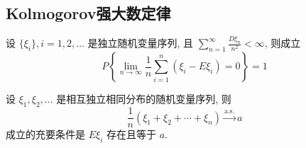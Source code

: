 \subsection{Kolmogorov强大数定律}\label{subsec:Kolmogorov强大数定律}
\begin{theorem} \label{thm:kolmogorov_slln}
设 $\{\xi_i\}, i = 1,2,\ldots$ 是独立随机变量序列, 且 $\sum_{n=1}^\infty \frac{D\xi_n}{n^2} < \infty$, 则成立
\begin{equation} \label{eq:kolmogorov_slln_formula}
P\left\{ \lim_{n\to\infty} \frac{1}{n}\sum_{i=1}^n (\xi_i - E\xi_i) = 0 \right\} = 1
\end{equation}
\end{theorem}
\begin{theorem}[i.i.d.下的Kolmogorov] \label{thm:kolmogorov_slln_iid}
设 $\xi_1, \xi_2, \ldots$ 是相互独立相同分布的随机变量序列, 则
\begin{equation} \label{eq:kolmogorov_slln_iid_formula}
\frac{1}{n}(\xi_1 + \xi_2 + \cdots + \xi_n) \xrightarrow{\text{a.s.}} a
\end{equation}
成立的充要条件是 $E\xi_i$ 存在且等于 $a$.
\end{theorem}